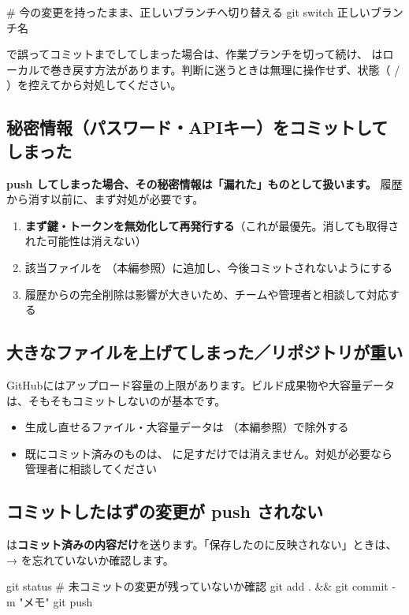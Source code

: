 \begin{codebox}[bash]
\begin{code}
# 今の変更を持ったまま、正しいブランチへ切り替える
git switch 正しいブランチ名
\end{code}
\end{codebox}

 で誤ってコミットまでしてしまった場合は、作業ブランチを切って続け、 はローカルで巻き戻す方法があります。判断に迷うときは無理に操作せず、状態（ / ）を控えてから対処してください。

\subsection{秘密情報（パスワード・APIキー）をコミットしてしまった}

\begin{warnbox}
\textbf{push してしまった場合、その秘密情報は「漏れた」ものとして扱います。} 履歴から消す以前に、まず対処が必要です。
\end{warnbox}

\begin{enumerate}[leftmargin=1.6em]
  \item \textbf{まず鍵・トークンを無効化して再発行する}（これが最優先。消しても取得された可能性は消えない）
  \item 該当ファイルを （本編参照）に追加し、今後コミットされないようにする
  \item 履歴からの完全削除は影響が大きいため、チームや管理者と相談して対応する
\end{enumerate}

\subsection{大きなファイルを上げてしまった／リポジトリが重い}

GitHubにはアップロード容量の上限があります。ビルド成果物や大容量データは、そもそもコミットしないのが基本です。

\begin{itemize}[leftmargin=1.4em]
  \item 生成し直せるファイル・大容量データは （本編参照）で除外する
  \item 既にコミット済みのものは、 に足すだけでは消えません。対処が必要なら管理者に相談してください
\end{itemize}

\subsection{コミットしたはずの変更が push されない}

 は\textbf{コミット済みの内容だけ}を送ります。「保存したのに反映されない」ときは、 →  を忘れていないか確認します。

\begin{codebox}[bash]
\begin{code}
git status                    # 未コミットの変更が残っていないか確認
git add . && git commit -m "メモ"
git push
\end{code}
\end{codebox}
